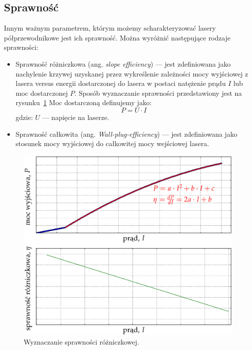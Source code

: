 \subsection{Sprawność}
Innym ważnym parametrem, którym możemy scharakteryzować lasery półprzewodnikowe jest ich sprawność. Można wyróżnić następujące rodzaje sprawności:
\begin{itemize}
\item Sprawność różniczkowa (ang. \textit{slope efficiency}) --- jest zdefiniowana jako nachylenie krzywej uzyskanej przez wykreślenie zależności
mocy wyjściowej z lasera versus energii dostarczonej do lasera w postaci natężenie prądu $I$ lub moc dostarczonej $P$. Sposób wyznaczanie sprawności
przedstawiony jest na rysunku~\ref{fig:teoria_rys_2}
Moc dostarczoną definujemy jako:
\begin{equation}
P = U \cdot I
\end{equation}
gdzie: $U$ --- napięcie na laserze.
\item Sprawność całkowita (ang. \textit{Wall-plug-efficiency}) --- jest zdefiniowana jako stosunek mocy wyjściowej do całkowitej mocy wejściowej lasera.
\end{itemize}
\begin{figure}[H]
\center
  \includegraphics[scale=0.30]{plot_eff_theory.eps}
  \caption{Wyznaczanie sprawności różniczkowej.}
  \label{fig:teoria_rys_2}
\end{figure}
